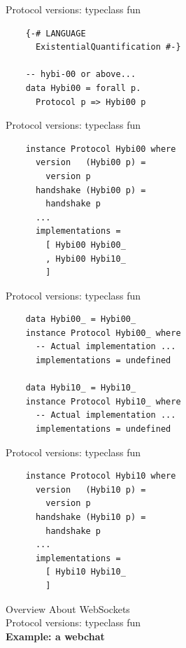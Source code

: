 \documentclass[20pt]{beamer}
\begin{document}
\begin{frame}[fragile]{Protocol versions: typeclass fun}
    \begin{lstlisting}
    {-# LANGUAGE
      ExistentialQuantification #-}

    -- hybi-00 or above...
    data Hybi00 = forall p.
      Protocol p => Hybi00 p
    \end{lstlisting}
\end{frame}

\begin{frame}[fragile]{Protocol versions: typeclass fun}
    \begin{lstlisting}
    instance Protocol Hybi00 where
      version   (Hybi00 p) =
        version p
      handshake (Hybi00 p) =
        handshake p
      ...
      implementations =
        [ Hybi00 Hybi00_
        , Hybi00 Hybi10_
        ]
    \end{lstlisting}
\end{frame}

\begin{frame}[fragile]{Protocol versions: typeclass fun}
    \begin{lstlisting}
    data Hybi00_ = Hybi00_
    instance Protocol Hybi00_ where
      -- Actual implementation ...
      implementations = undefined

    data Hybi10_ = Hybi10_
    instance Protocol Hybi10_ where
      -- Actual implementation ...
      implementations = undefined
    \end{lstlisting}
\end{frame}

\begin{frame}[fragile]{Protocol versions: typeclass fun}
    \begin{lstlisting}
    instance Protocol Hybi10 where
      version   (Hybi10 p) =
        version p
      handshake (Hybi10 p) =
        handshake p
      ...
      implementations =
        [ Hybi10 Hybi10_
        ]
    \end{lstlisting}
\end{frame}


\begin{frame}{Overview}
    About WebSockets \\
    Protocol versions: typeclass fun \\
    \textbf{Example: a webchat} \\
\end{frame}
\end{document}
